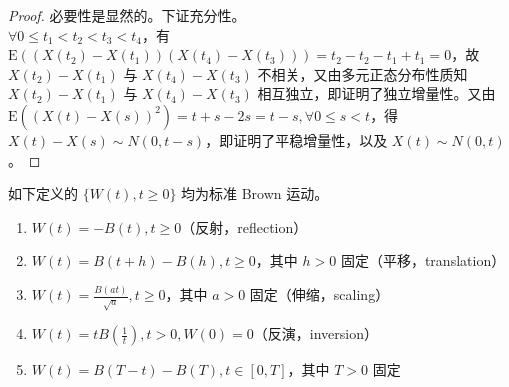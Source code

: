 \documentclass[../main.tex]{subfiles}
\begin{document}
\begin{proof}
    必要性是显然的。下证充分性。\\
    $\forall 0\leq t_1<t_2<t_3<t_4$，有 $\mathrm E((X(t_2)-X(t_1))(X(t_4)-X(t_3)))=t_2-t_2-t_1+t_1=0$，故 $X(t_2)-X(t_1)$ 与 $X(t_4)-X(t_3)$ 不相关，又由多元正态分布性质知 $X(t_2)-X(t_1)$ 与 $X(t_4)-X(t_3)$ 相互独立，即证明了独立增量性。又由 $\mathrm E((X(t)-X(s))^2)=t+s-2s=t-s,\forall0\leq s<t$，得 $X(t)-X(s)\sim N(0,t-s)$，即证明了平稳增量性，以及 $X(t)\sim N(0,t)$。
\end{proof}

\begin{proposition}
    如下定义的 $\{W(t),t\geq0\}$ 均为标准 Brown 运动。
    \begin{enumerate}
        \item $W(t)=-B(t),t\geq0$（反射，reflection）
        \item $W(t)=B(t+h)-B(h),t\geq0$，其中 $h>0$ 固定（平移，translation）
        \item $W(t)=\frac{B(at)}{\sqrt a},t\geq0$，其中 $a>0$ 固定（伸缩，scaling）
        \item $W(t)=tB(\frac1t),t>0,W(0)=0$（反演，inversion）
        \item $W(t)=B(T-t)-B(T),t\in[0,T]$，其中 $T>0$ 固定
    \end{enumerate}
\end{proposition}
\end{document}
